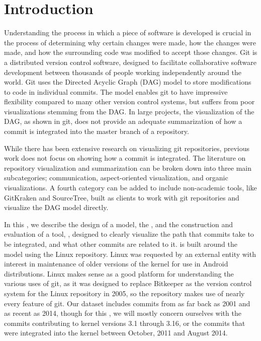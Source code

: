 \chapter{Introduction}

Understanding the process in which a piece of software is developed is
crucial in the process of determining why certain changes were made, how
the changes were made, and how the surrounding code was modified to
accept those changes. Git is a distributed version control software,
designed to facilitate collaborative software development between
thousands of people working independently around the world. Git uses the
Directed Acyclic Graph (DAG) model to store modifications to code in
individual commits. The model enables git to have impressive flexibility
compared to many other version control systems, but suffers from poor
visualizations stemming from the DAG. In large projects, the
visualization of the DAG, as shown in git, does not provide an adequate
summarization of how a commit is integrated into the master branch of a
repository.


While there has been extensive research on visualizing git repositories,
previous work does not focus on showing how a commit is integrated. The
literature on repository visualization and summarization can be broken
down into three main subcategories;
communication\cite{Cubranic2005,Begel2010}, aspect-oriented
visualization\cite{Ambros2005,Burch2005,Ambros2009}, and organic
visualizations\cite{ogawa09,Caudwell2010}. A fourth category can be
added to include non-academic tools, like GitKraken and SourceTree,
built as clients to work with git repositories and visualize the DAG
model directly.

In this \paper{} , we describe the
design of a model, the \mt{}, and the construction and evaluation of a
tool, \tool{}, designed to clearly visualize the path that commits take
to be integrated, and what other commits are related to it. \tool{} is
built around the \mt{} model using the Linux repository. Linux was
requested by an external entity with interest in maintenance of older
versions of the kernel for use in Android distributions. Linux makes
sense as a good platform for understanding the various uses of git, as
it was designed to replace Bitkeeper as the version control system for
the Linux repository in 2005, so the repository makes use of nearly
every feature of git. Our dataset includes commits from as far back as
2001 and as recent as 2014, though for this \paper{}, we will mostly
concern ourselves with the commits contributing to kernel versions 3.1
through 3.16, or the commits that were integrated into the kernel
between October, 2011 and August 2014.

